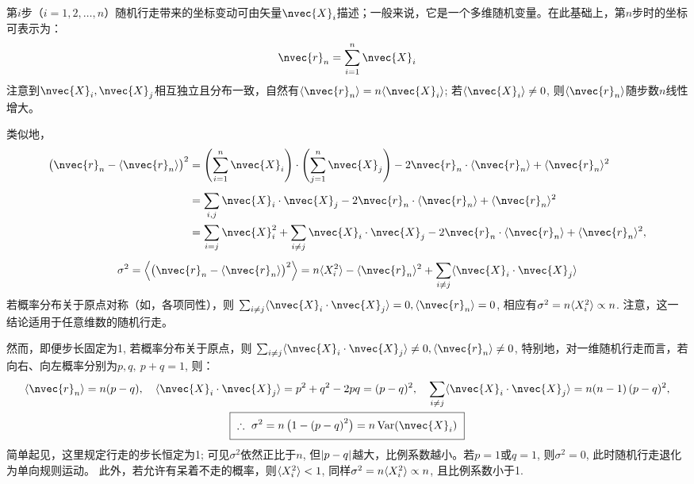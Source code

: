 \documentclass[preview,10pt,border=8pt]{standalone}
\begin{document}
\let\vec\nvec %
	第$i$步（$i = 1,2,\dots,n$）随机行走带来的坐标变动可由矢量$\vec{X}_i$描述；一般来说，它是一个多维随机变量。在此基础上，第$n$步时的坐标可表示为：
	\begin{equation}
		\vec{r}_n = \sum^n_{i = 1} \vec{X}_i
	\end{equation}
	注意到$\vec{X}_i, \vec{X}_j$相互独立且分布一致，自然有$\ave{\vec{r}_n} = n \ave{\vec{X}_i}$; 若$\ave{\vec{X}_i} \ne 0$, 则$\ave{\vec{r}_n}$随步数$n$线性增大。
	
	类似地，
	\begin{gather}
	\begin{aligned}
		\pqty\big{\vec{r}_n - \ave{\vec{r}_n}}^2
		&= \pqty\Bigg{
			\sum^n_{i = 1} \vec{X}_i
		}\cdot\pqty\Bigg{
			\sum^n_{j = 1} \vec{X}_j
		} - 2\vec{r}_n\cdot\ave{\vec{r}_n}
			+ \ave{\vec{r}_n}^2\\[.8ex]
		&= \sum_{i, j} \vec{X}_i\cdot\vec{X}_j
			- 2\vec{r}_n\cdot\ave{\vec{r}_n}
			+ \ave{\vec{r}_n}^2 \\
		&= \sum_{i = j} \vec{X}^2_i 
			+ \sum_{i \ne j}
				\vec{X}_i\cdot\vec{X}_j
			- 2\vec{r}_n\cdot\ave{\vec{r}_n}
			+ \ave{\vec{r}_n}^2,
	\end{aligned}\\[1ex]
	\sigma^2 = \ave*{\pqty\big{
		\vec{r}_n - \ave{\vec{r}_n}
	}^2}
	= n \ave{X^2_i} - \ave{\vec{r}_n}^2
		+ \sum_{i \ne j}
			\ave{\vec{X}_i\cdot\vec{X}_j}
	\end{gather}
	若概率分布关于原点对称（如，各项同性），则
	$\sum_{i \ne j}
			\ave{\vec{X}_i\cdot\vec{X}_j} = 0, 
		\ave{\vec{r}_n} = 0$, 
	相应有$\sigma^2 = n \langle X^2_i\rangle \propto n$. 
	注意，这一结论适用于任意维数的随机行走。
	
	然而，即便步长固定为1, 若概率分布关于原点，则
	$\sum_{i \ne j}
			\ave{\vec{X}_i\cdot\vec{X}_j} \ne 0, 
		\ave{\vec{r}_n} \ne 0$, 
	特别地，对一维随机行走而言，若向右、向左概率分别为$p, q,\ p + q = 1$, 则：
	\begin{gather}
		\ave{\vec{r}_n} = n(p - q),\quad
		\ave{\vec{X}_i\cdot\vec{X}_j}
		= p^2 + q^2 - 2pq = (p - q)^2,\quad
		\sum_{i \ne j}
			\ave{\vec{X}_i\cdot\vec{X}_j}
		= n(n - 1)\,(p - q)^2,\\
		\boxed{\ \therefore\ \sigma^2
		= n\,\pqty\big{1 - \pqty{p - q}^2}
		= n\,\mrm{Var}(\vec{X}_i)
		\ \vphantom{\Big|}}
	\end{gather}
	简单起见，这里规定行走的步长恒定为1; 可见$\sigma^2$依然正比于$n$, 但$\abs{p - q}$越大，比例系数越小。若$p = 1$或$q = 1$, 则$\sigma^2 = 0$, 此时随机行走退化为单向规则运动。
	此外，若允许有呆着不走的概率，则$\langle X^2_i\rangle < 1$, 同样$\sigma^2 = n \langle X^2_i\rangle \propto n$, 且比例系数小于1. 
\end{document}
